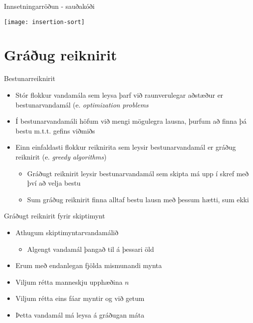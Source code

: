 \documentclass[handout]{beamer}
\begin{document}
\begin{frame}{Innsetningarröðun - sauðakóði}
\begin{center}
\texttt{[image: insertion-sort]}
\end{center}
\end{frame}

\section{Gráðug reiknirit}

\begin{frame}{Bestunarreiknirit}
\begin{itemize}
 \item Stór flokkur vandamála sem leysa þarf við raunverulegar aðstæður er bestunarvandamál (e. \emph{optimization problems}
 \item Í bestunarvandamáli höfum við mengi mögulegra lausna, þurfum að finna þá bestu m.t.t. gefins viðmiðs
 \item Einn einfaldasti flokkur reiknirita sem leysir bestunarvandamál er gráðug reiknirit (e. \emph{greedy algorithms})
 \begin{itemize}
  \item Gráðugt reiknirit leysir bestunarvandamál sem skipta má upp í skref með því að velja bestu
  \item Sum gráðug reiknirit finna alltaf bestu lausn með þessum hætti, sum ekki
 \end{itemize}
\end{itemize}
\end{frame}

\begin{frame}{Gráðugt reiknirit fyrir skiptimynt}
\begin{itemize}
 \item Athugum skiptimyntarvandamálið
 \begin{itemize}
  \item Algengt vandamál þangað til á þessari öld
 \end{itemize}
 \item Erum með endanlegan fjölda mismunandi mynta
 \item Viljum rétta manneskju upphæðina $n$
 \item Viljum rétta eins fáar myntir og við getum
 \item Þetta vandamál má leysa á gráðugan máta
\end{itemize}
\end{frame}
\end{document}
